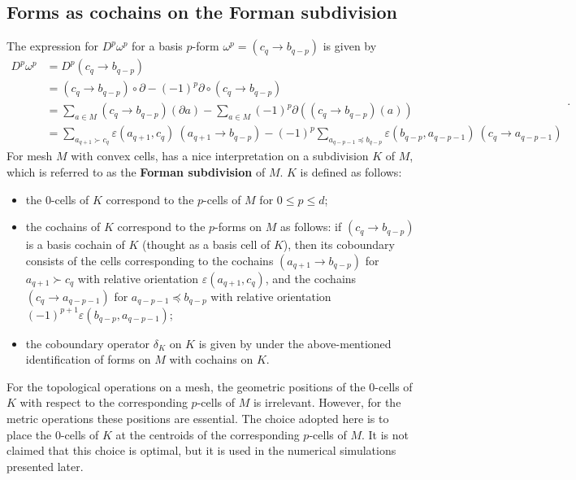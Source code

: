 \documentclass{elsarticle}
\theoremstyle{definition}
\begin{document}
\subsection{Forms as cochains on the Forman subdivision}
\label{sec:forman}
The expression for $D^p \omega^{p}$ for a basis $p$-form $\omega^p = (c_q \to b_{q - p})$ is given by
\begin{equation}
\label{eq:discrete_exterior_derivative}
  \begin{split}
    D^p \omega^p
      & = D^p (c_q \to b_{q - p}) \\
      & = (c_q \to b_{q - p}) \circ \partial - 
        (-1)^p \partial \circ (c_q \to b_{q - p}) \\
      & = \sum_{a \in M} (c_q \to b_{q - p})(\partial a) 
        - \sum_{a \in M} (-1)^p \partial ((c_q \to b_{q - p})(a)) \\
      & = \sum_{a_{q + 1} \succ c_q} 
          \varepsilon(a_{q + 1}, c_q)\ (a_{q + 1} \to b_{q - p})
        - (-1)^p \sum_{a_{q - p - 1} \preceq b_{q - p}} 
          \varepsilon(b_{q - p}, a_{q - p - 1})\ (c_q \to a_{q - p - 1})
  \end{split}.
\end{equation}
For mesh $M$ with convex cells,  has a nice interpretation on a subdivision $K$ of $M$, which is referred to as the \textbf{Forman subdivision} of $M$. $K$ is defined as follows:
\begin{itemize}
  \item
    the $0$-cells of $K$ correspond to the $p$-cells of $M$ for $0 \le p \le d$;
  \item
    the cochains of $K$ correspond to the $p$-forms on $M$ as follows: if $(c_q \to b_{q - p})$ is a basis cochain of $K$ (thought as a basis cell of $K$), then its coboundary consists of the cells corresponding to the cochains $(a_{q + 1} \to b_{q - p})$ for $a_{q + 1} \succ c_{q}$ with relative orientation $\varepsilon(a_{q + 1}, c_q)$, and the cochains $(c_q \to a_{q - p - 1})$ for $a_{q - p - 1} \preceq b_{q - p}$ with relative orientation $(-1)^{p + 1} \varepsilon(b_{q - p}, a_{q - p - 1})$;
  \item
    the coboundary operator $\delta_K$ on $K$ is given by  under the above-mentioned identification of forms on $M$ with cochains on $K$.
\end{itemize}
For the topological operations on a mesh, the geometric positions of the $0$-cells of $K$ with respect to the corresponding $p$-cells of $M$ is irrelevant. However, for the metric operations these positions are essential. The choice adopted here is to place the $0$-cells of $K$ at the centroids of the corresponding $p$-cells of $M$. It is not claimed that this choice is optimal, but it is used in the numerical simulations presented later. 
\end{document}

